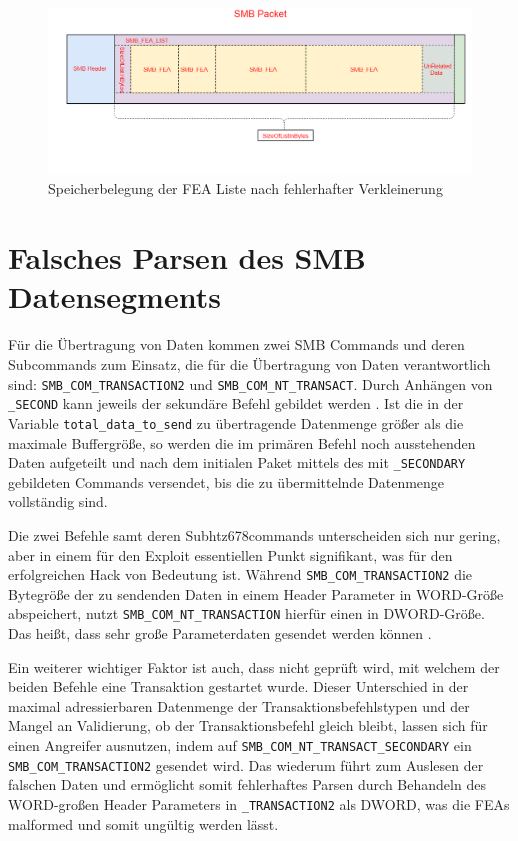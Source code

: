 \documentclass[DIV=12,headings=normal,pdftex,headinclude=false,footinclude=false,final]{scrreprt}
\begin{document}
\begin{figure}[H]
    \centering
    \includegraphics[width=15cm]{checkpoint_after_shrink_error.png}
    \caption[FEAList nach fehlerhafter Verkleinerung, Nadav Grossmann (Checkpoint Research), URL: \url{https://research.checkpoint.com/wp-content/uploads/2017/09/eternalblue6.png}]{Speicherbelegung der FEA Liste nach fehlerhafter Verkleinerung}
    \label{img:fealist_after_shrinking_incorrectly}
\end{figure}

\section{Falsches Parsen des SMB Datensegments}
Für die Übertragung von Daten kommen zwei SMB Commands und deren Subcommands zum Einsatz, die für die Übertragung von Daten verantwortlich sind: \verb|SMB_COM_TRANSACTION2| und \verb|SMB_COM_NT_TRANSACT|. Durch Anhängen von \verb|_SECOND| kann jeweils der sekundäre Befehl gebildet werden \cite{MS:SMBCom}. Ist die in der Variable \verb|total_data_to_send| zu übertragende Datenmenge größer als die maximale Buffergröße, so werden die im primären Befehl noch ausstehenden Daten aufgeteilt und nach dem initialen Paket mittels des mit \verb|_SECONDARY|  gebildeten Commands versendet, bis die zu übermittelnde Datenmenge vollständig sind\cite{TM:EB}.

\noindent
Die zwei Befehle samt deren Subhtz678commands unterscheiden sich nur gering, aber in einem für den Exploit essentiellen Punkt signifikant, was für den erfolgreichen Hack von Bedeutung ist. Während \verb|SMB_COM_TRANSACTION2| die Bytegröße der zu sendenden Daten in einem Header Parameter in WORD-Größe abspeichert, nutzt \verb|SMB_COM_NT_TRANSACTION| hierfür einen in DWORD-Größe. Das heißt, dass sehr große Parameterdaten gesendet werden können \cite{CP}.

\noindent
Ein weiterer wichtiger Faktor ist auch, dass nicht geprüft wird, mit welchem der beiden Befehle eine Transaktion gestartet wurde. Dieser Unterschied in der maximal adressierbaren Datenmenge der Transaktionsbefehlstypen und der Mangel an Validierung, ob der Transaktionsbefehl gleich bleibt, lassen sich für einen Angreifer ausnutzen, indem auf \verb|SMB_COM_NT_TRANSACT_SECONDARY| ein \verb|SMB_COM_TRANSACTION2| gesendet wird. Das wiederum führt zum Auslesen der falschen Daten und ermöglicht somit fehlerhaftes Parsen durch Behandeln des WORD-großen Header Parameters in \verb|_TRANSACTION2| als DWORD, was die FEAs malformed und somit ungültig werden lässt\cite{CP}.
\end{document}
